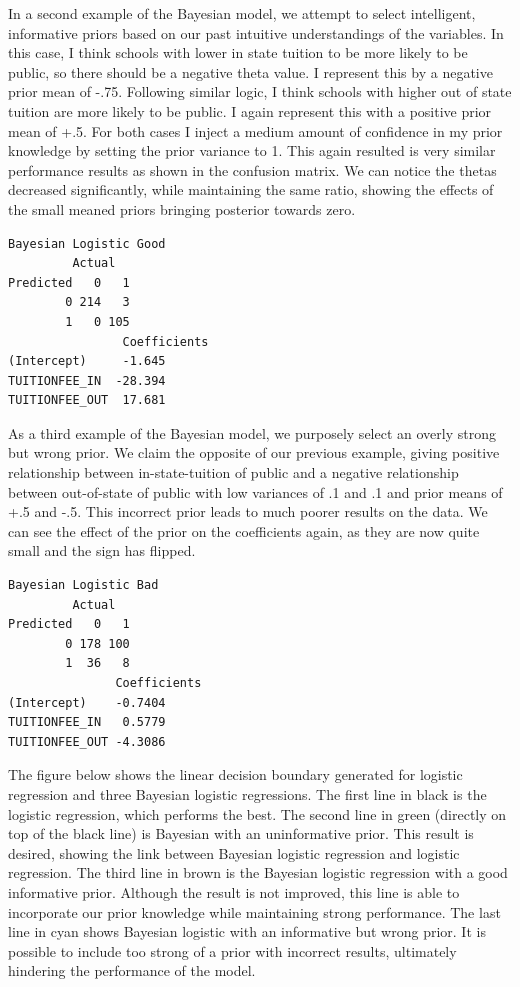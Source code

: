 \documentclass[10pt]{article}
\begin{document}
In a second example of the Bayesian model, we attempt to select intelligent, informative priors based on our past intuitive understandings of the variables. In this case, I think schools with lower in state tuition to be more likely to be public, so there should be a negative theta value. I represent this by a negative prior mean of -.75. Following similar logic, I think schools with higher out of state tuition are more likely to be public. I again represent this with a positive prior mean of +.5. For both cases I inject a medium amount of confidence in my prior knowledge by setting the prior variance to 1. This again resulted is very similar performance results as shown in the confusion matrix. We can notice the thetas decreased significantly, while maintaining the same ratio, showing the effects of the small meaned priors bringing posterior towards zero.\\

\begin{lstlisting}
Bayesian Logistic Good
         Actual
Predicted   0   1
        0 214   3
        1   0 105
                Coefficients
(Intercept)     -1.645 
TUITIONFEE_IN  -28.394
TUITIONFEE_OUT  17.681 
\end{lstlisting}

As a third example of the Bayesian model, we purposely select an overly strong but wrong prior. We claim the opposite of our previous example, giving positive relationship between in-state-tuition of public and a negative relationship between out-of-state of public with low variances of .1 and .1 and prior means of +.5 and -.5. This incorrect prior leads to much poorer results on the data. We can see the effect of the prior on the coefficients again, as they are now quite small and the sign has flipped.

\begin{lstlisting}
Bayesian Logistic Bad
         Actual
Predicted   0   1
        0 178 100
        1  36   8
               Coefficients
(Intercept)    -0.7404 
TUITIONFEE_IN   0.5779
TUITIONFEE_OUT -4.3086 
\end{lstlisting}


The figure below shows the linear decision boundary generated for logistic regression and three Bayesian logistic regressions. The first line in black is the logistic regression, which performs the best. The second line in green (directly on top of the black line) is Bayesian with an uninformative prior. This result is desired, showing the link between Bayesian logistic regression and logistic regression. The third line in brown is the Bayesian logistic regression with a good informative prior. Although the result is not improved, this line is able to incorporate our prior knowledge while maintaining strong performance. The last line in cyan shows Bayesian logistic with an informative but wrong prior. It is possible to include too strong of a prior with incorrect results, ultimately hindering the performance of the model.
\end{document}
